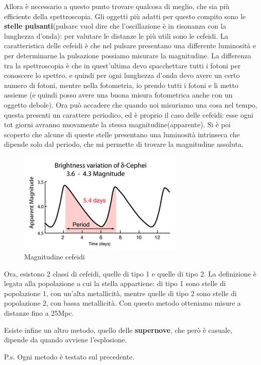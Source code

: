 \documentclass[a4paper,11pt]{article}
\begin{document}
Allora è necessario a questo punto trovare qualcosa di meglio, che sia più efficiente della spettroscopia. Gli oggetti più adatti per questo compito sono le \textbf{stelle pulsanti}(pulsare vuol dire che l'oscillazione è in risonanza con la lunghezza d'onda): per valutare le distanze le più utili sono le cefeidi. La caratteristica delle cefeidi è che nel pulsare presentano una differente luminosità e per determinarne la pulsazione possiamo misurare la magnitudine. La differenza tra la spettroscopia è che in quest'ultima devo spacchettare tutti i fotoni per conoscere lo spettro, e quindi per ogni lunghezza d'onda devo avere un certo numero di fotoni, mentre nella fotometria, io prendo tutti i fotoni e li metto assieme (e quindi posso avere una buona misura fotometrica anche con un oggetto debole). Ora può accadere che quando noi misuriamo una cosa nel tempo, questa presenti un carattere periodico, ed è proprio il caso delle cefeidi: esse ogni tot giorni avranno nuovamente la stessa magnitudine(apparente). Si è poi scoperto che alcune di queste stelle presentano una luminosità intrinseca che dipende solo dal periodo, che mi permette di trovare la magnitudine assoluta.
\begin{figure}[h!!]
        \centering
        \includegraphics[width=8cm]{Magnitudine cefeidi.JPG}
        \caption{Magnitudine cefeidi}
        \label{fig:Correnti parassite}
    \end{figure}

Ora, esistono 2 classi di cefeidi, quelle di tipo 1 e quelle di tipo 2. La definizione è legata alla popolazione a cui la stella appartiene: di tipo 1 sono stelle di popolazione 1, con un'alta metallicità, mentre quelle di tipo 2 sono stelle di popolazione 2, con bassa metallicità. Con questo metodo otteniamo misure a distanze fino a 25Mpc.

Esiste infine un altro metodo, quello delle \textbf{supernove}, che però è casuale, dipende da quando avviene l'esplosione.

P.s. Ogni metodo è testato sul precedente.
\end{document}

